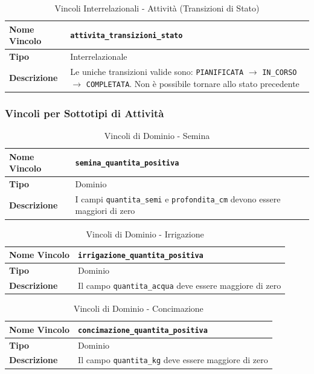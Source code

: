 \documentclass[12pt,a4paper]{article}
\begin{document}
\begin{table}[H]
\centering
\caption{Vincoli Interrelazionali - Attività (Transizioni di Stato)}
\begin{tabularx}{\textwidth}{|l|X|}
\hline
\textbf{Nome Vincolo} & \texttt{attivita\_transizioni\_stato} \\
\hline
\textbf{Tipo} & Interrelazionale \\
\hline
\textbf{Descrizione} & Le uniche transizioni valide sono: \texttt{PIANIFICATA} $\rightarrow$ \texttt{IN\_CORSO} $\rightarrow$ \texttt{COMPLETATA}. Non è possibile tornare allo stato precedente \\
\hline
\end{tabularx}
\end{table}

\subsubsection{Vincoli per Sottotipi di Attività}

\begin{table}[H]
\centering
\caption{Vincoli di Dominio - Semina}
\begin{tabularx}{\textwidth}{|l|X|}
\hline
\textbf{Nome Vincolo} & \texttt{semina\_quantita\_positiva} \\
\hline
\textbf{Tipo} & Dominio \\
\hline
\textbf{Descrizione} & I campi \texttt{quantita\_semi} e \texttt{profondita\_cm} devono essere maggiori di zero \\
\hline
\end{tabularx}
\end{table}

\begin{table}[H]
\centering
\caption{Vincoli di Dominio - Irrigazione}
\begin{tabularx}{\textwidth}{|l|X|}
\hline
\textbf{Nome Vincolo} & \texttt{irrigazione\_quantita\_positiva} \\
\hline
\textbf{Tipo} & Dominio \\
\hline
\textbf{Descrizione} & Il campo \texttt{quantita\_acqua} deve essere maggiore di zero \\
\hline
\end{tabularx}
\end{table}

\begin{table}[H]
\centering
\caption{Vincoli di Dominio - Concimazione}
\begin{tabularx}{\textwidth}{|l|X|}
\hline
\textbf{Nome Vincolo} & \texttt{concimazione\_quantita\_positiva} \\
\hline
\textbf{Tipo} & Dominio \\
\hline
\textbf{Descrizione} & Il campo \texttt{quantita\_kg} deve essere maggiore di zero \\
\hline
\end{tabularx}
\end{table}
\end{document}
